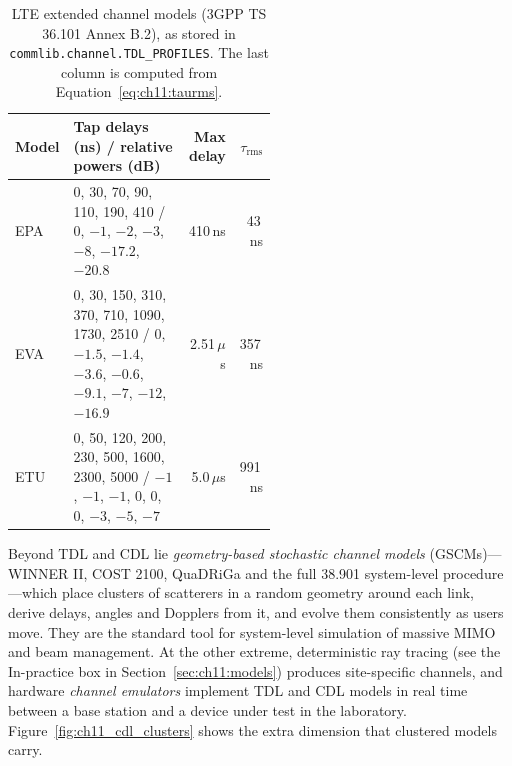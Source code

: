 \begin{table}[htbp]\centering\small
\caption{LTE extended channel models (3GPP TS 36.101 Annex B.2), as stored in
\texttt{commlib.channel.TDL\_PROFILES}. The last column is computed from Equation~\eqref{eq:ch11:taurms}.}
\label{tab:ch11:lteprofiles}
\begin{tabular}{@{}lp{0.52\linewidth}rr@{}}
\toprule
Model & Tap delays (ns) / relative powers (dB) & Max delay & $\tau_{\text{rms}}$\\
\midrule
EPA & 0, 30, 70, 90, 110, 190, 410 / 0, $-1$, $-2$, $-3$, $-8$, $-17.2$, $-20.8$ & 410\,ns & 43\,ns\\
EVA & 0, 30, 150, 310, 370, 710, 1090, 1730, 2510 / 0, $-1.5$, $-1.4$, $-3.6$, $-0.6$, $-9.1$, $-7$, $-12$, $-16.9$ & 2.51\,$\mu$s & 357\,ns\\
ETU & 0, 50, 120, 200, 230, 500, 1600, 2300, 5000 / $-1$, $-1$, $-1$, 0, 0, 0, $-3$, $-5$, $-7$ & 5.0\,$\mu$s & 991\,ns\\
\bottomrule
\end{tabular}
\end{table}

Beyond TDL and CDL lie \emph{geometry-based stochastic channel models} (GSCMs)---WINNER II,
COST 2100, QuaDRiGa and the full 38.901 system-level procedure---which place clusters of scatterers
in a random geometry around each link, derive delays, angles and Dopplers from it, and evolve
them consistently as users move. They are the standard tool for system-level simulation of
massive MIMO and beam management. At the other extreme, deterministic ray tracing (see the
In-practice box in Section~\ref{sec:ch11:models}) produces site-specific channels, and hardware
\emph{channel emulators} implement TDL and CDL models in real time between a base station and a
device under test in the laboratory. Figure~\ref{fig:ch11_cdl_clusters} shows the extra dimension that clustered models carry.


